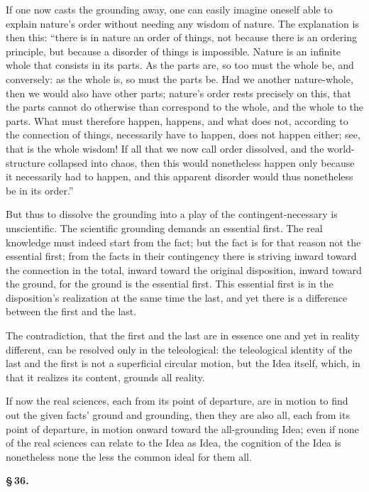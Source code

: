 \documentclass[12pt]{book}
\begin{document}
If one now casts the grounding away, one can easily imagine oneself able to explain nature's order without
needing any wisdom of nature. The explanation is then this: ``there is in nature an order of things, not
because there is an ordering principle, but
because a disorder of things is impossible. Nature is an infinite whole that consists in its parts. As
the parts are, so too must the whole be, and conversely: as the whole is, so must the parts be. Had we
another nature-whole, then we would also have other parts; nature's order rests precisely on this, that
the parts cannot do otherwise than correspond to the whole, and the whole to the parts. What must
therefore happen, happens, and what does not, according to the connection of things, necessarily have to
happen, does not happen either; see, that is the whole wisdom! If all that we now call order dissolved,
and the world-structure collapsed into chaos, then this would nonetheless happen only
because it necessarily
had to happen, and this apparent disorder would thus nonetheless be in its order.''

But thus to dissolve the grounding into a play of the contingent-necessary is unscientific. The scientific
grounding demands an essential first. The real knowledge must indeed start from the fact; but the fact is
for that reason not the essential first; from the facts in their contingency there is striving inward
toward the connection in the total, inward toward the original disposition, inward toward the ground, for
the ground is the essential first. This essential first is in the disposition's realization at the same
time the last, and yet there is a difference between the first and the last.

The contradiction, that the first and the last are in essence one and yet in reality different, can be
resolved only in the teleological: the teleological identity of the last and the first is not a superficial
circular motion, but the Idea itself, which, in that it realizes its content, grounds all reality.

If now the real sciences, each from its point of departure, are in motion to find out the given facts'
ground and grounding, then they are also all, each from its point of departure, in motion onward toward
the all-grounding Idea; even if none of the real sciences can relate to the Idea as Idea, the cognition of
the Idea is nonetheless none the less the common ideal for them all.

\begin{center}{\bfseries \S\,36.}\end{center}
\end{document}
